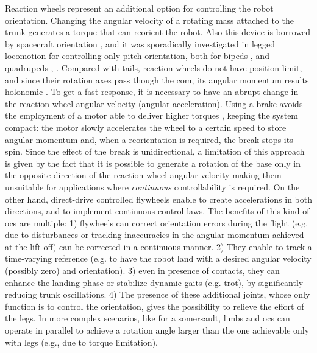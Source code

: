 \documentclass[letterpaper, 10 pt, conference]{ieeeconf}  %
\begin{document}
Reaction wheels represent an additional option for controlling the robot orientation.
Changing the angular velocity of a rotating mass attached to the trunk generates a torque that can reorient the robot. Also this device is borrowed by spacecraft orientation \cite{oland2009reaction}, and it was sporadically investigated in legged locomotion for controlling only pitch orientation, both for bipeds \cite{Brown2016}, \cite{xiong2020sequential} and quadrupeds \cite{kolvenbach2019towards}, \cite{vasilopoulos2016quadruped}.
Compared with tails, reaction wheels do not have position limit, and since their rotation axes pass though the \gls{com}, its angular momentum results holonomic \cite{machairas2015quadruped}.
To get a fast response, it is necessary to have an abrupt change in the reaction wheel angular velocity (angular acceleration).
Using a brake avoids the employment of a motor able to deliver higher torques \cite{gajamohan2012cubli}, 
keeping the system compact: the motor slowly accelerates the wheel to a certain speed to store angular momentum and, when a reorientation is required, the break stops its spin.
Since the effect of the break is unidirectional,
a limitation of this approach is given by the fact that it is possible to generate a rotation of the base only in the opposite direction of the reaction wheel angular velocity making them unsuitable 
for applications where \textit{continuous} controllability is required. On the other hand, direct-drive controlled flywheels enable to create accelerations in both directions,  and  to implement continuous control laws. The benefits of this kind of  \gls{ocs} are multiple: 1) flywheels can correct orientation errors during the flight  (e.g.   due to disturbances or tracking inaccuracies in the angular momentum achieved at the lift-off)   %
can be corrected in a continuous manner. 2) They enable to track a time-varying reference (e.g. to have the robot land with a desired angular velocity (possibly zero) and orientation).
3) even in presence of contacts, they can enhance the landing phase or stabilize  dynamic gaits (e.g. trot), by significantly reducing trunk oscillations.  
4) The presence of these additional joints, whose only function is to control the orientation, gives the possibility to relieve the effort of the legs.
In more complex scenarios, like for a somersault, limbs and \gls{ocs} can operate in parallel to 
achieve a rotation angle larger than the one achievable only with legs (e.g., due to torque limitation). 
\end{document}
